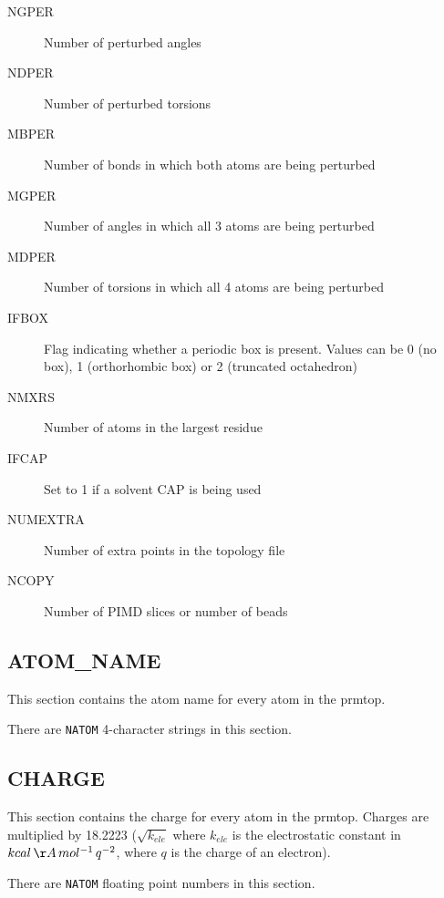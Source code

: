 \begin{description}
   \item[NGPER] Number of perturbed angles \footnotemark
      \addtocounter{footnote}{-1} \addtocounter{Hfootnote}{-1}
   \item[NDPER] Number of perturbed torsions \footnotemark
      \addtocounter{footnote}{-1} \addtocounter{Hfootnote}{-1}
   \item[MBPER] Number of bonds in which both atoms are being perturbed
      \footmarknote \addtocounter{footnote}{-1} \addtocounter{Hfootnote}{-1}
   \item[MGPER] Number of angles in which all 3 atoms are being perturbed
      \footmarknote \addtocounter{footnote}{-1} \addtocounter{Hfootnote}{-1}
   \item[MDPER] Number of torsions in which all 4 atoms are being perturbed
      \footnotemark
   \item[IFBOX] Flag indicating whether a periodic box is present. Values can be
      0 (no box), 1 (orthorhombic box) or 2 (truncated octahedron)
   \item[NMXRS] Number of atoms in the largest residue
   \item[IFCAP] Set to 1 if a solvent CAP is being used
   \item[NUMEXTRA] Number of extra points in the topology file
   \item[NCOPY] Number of PIMD slices or number of beads
\end{description}

\subsection*{ATOM\_NAME}

This section contains the atom name for every atom in the prmtop.

\noindent There are {\tt NATOM} 4-character strings in this section.

\subsection*{CHARGE}

This section contains the charge for every atom in the prmtop. Charges are
multiplied by 18.2223 ($\sqrt{k_{ele}}$ where $k_{ele}$ is the electrostatic
constant in $kcal\, \AA\, mol^{-1}\, q^{-2}$, where $q$ is the charge of an
electron).


\noindent There are {\tt NATOM} floating point numbers in this section.


